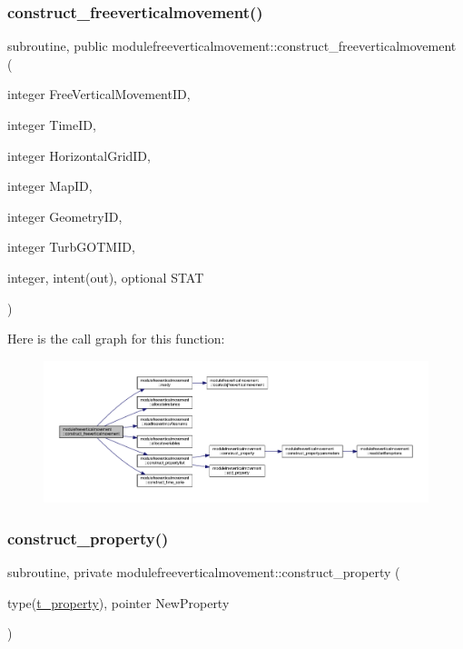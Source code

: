 \subsubsection{\texorpdfstring{construct\+\_\+freeverticalmovement()}{construct\_freeverticalmovement()}}
{\footnotesize\ttfamily subroutine, public modulefreeverticalmovement\+::construct\+\_\+freeverticalmovement (\begin{DoxyParamCaption}\item[{integer}]{Free\+Vertical\+Movement\+ID,  }\item[{integer}]{Time\+ID,  }\item[{integer}]{Horizontal\+Grid\+ID,  }\item[{integer}]{Map\+ID,  }\item[{integer}]{Geometry\+ID,  }\item[{integer}]{Turb\+G\+O\+T\+M\+ID,  }\item[{integer, intent(out), optional}]{S\+T\+AT }\end{DoxyParamCaption})}

Here is the call graph for this function\+:\nopagebreak
\begin{figure}[H]
\begin{center}
\leavevmode
\includegraphics[width=350pt]{namespacemodulefreeverticalmovement_a3b98553e1845617e703a449e92c798c9_cgraph}
\end{center}
\end{figure}
\mbox{\label{namespacemodulefreeverticalmovement_af393a68b806664c9eea39ca1dec93cf9}} 
\subsubsection{\texorpdfstring{construct\+\_\+property()}{construct\_property()}}
{\footnotesize\ttfamily subroutine, private modulefreeverticalmovement\+::construct\+\_\+property (\begin{DoxyParamCaption}\item[{type(\mbox{\hyperlink{structmodulefreeverticalmovement_1_1t__property}{t\+\_\+property}}), pointer}]{New\+Property }\end{DoxyParamCaption})\hspace{0.3cm}{\ttfamily [private]}}

